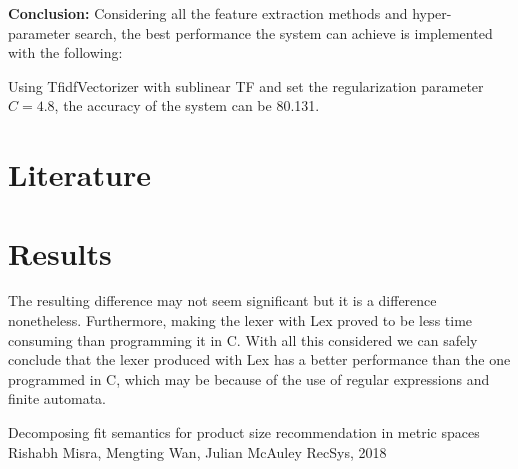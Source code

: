 \documentclass[letterpaper, 10 pt, conference]{ieeeconf}  %
\begin{document}
\textbf{Conclusion: } Considering all the feature extraction methods and hyper-parameter search, the best performance the system can achieve is implemented with the following: 

Using TfidfVectorizer with sublinear TF and set the regularization parameter $C=4.8$, the accuracy of the system can be 80.131.




\section{Literature}




\section{Results}

The resulting difference may not seem significant but it is a difference nonetheless. Furthermore, making the lexer with Lex proved to be less time consuming than programming it in C. With all this considered we can safely conclude that the lexer produced with Lex has a better performance than the one programmed in C, which may be because of the use of regular expressions and finite automata.


\addtolength{\textheight}{-12cm}   %









\begin{thebibliography}{99}

 Decomposing fit semantics for product size recommendation in metric spaces
Rishabh Misra, Mengting Wan, Julian McAuley
RecSys, 2018

\end{thebibliography}
\end{document}
